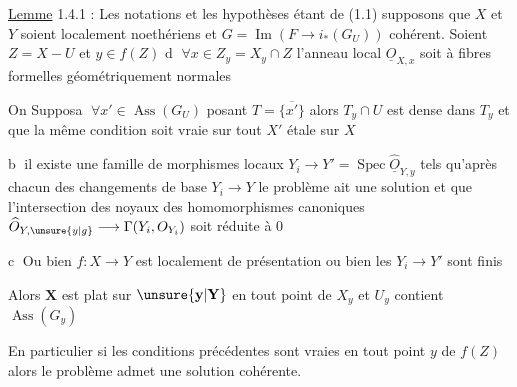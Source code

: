 \uline{Lemme} 1.4.1 : Les notations et les hypothèses étant
 de (1.1) supposons que $X$ et $Y$ soient localement
noethériens et $G=\operatorname{Im}(F\longrightarrow i_*(G_U))$ cohérent. Soient
 $Z=X-U$ et $y\in f(Z)$ 
\textcircled{d} $\forall x\in Z_y=X_y\cap Z$ l'anneau local $\underline O_{X,x}$ soit à fibres formelles
géométriquement normales

On Suppos\textcircled{a} $\forall x'\in\operatorname{Ass}(G_U)$ posant $T=\overline{\{x'\}}$ alors
$T_y\cap U$ est dense dans $T_y$ et que la même condition
soit vraie sur tout $X'$ étale sur $X$

\textcircled{b} il existe une famille de
morphismes locaux $Y_i\longrightarrow Y'=\operatorname{Spec}\widehat{\underline O}_{Y,y}$
tels qu'après chacun des changements de
base $Y_i\longrightarrow Y$ le problème ait une solution
et que l'intersection des noyaux des homomorphismes
canoniques $\widehat O_{Y,\unsure{y|g}}\longrightarrow\Gamma(Y_i,O_{Y_i})$ soit
réduite à $0$

\textcircled{c} Ou bien $f\colon X\longrightarrow Y$ est localement
de présentation  ou bien les $Y_i\longrightarrow Y'$
sont finis

Alors $\mathbf X$ est plat sur $\unsure{\mathbf y|\mathbf Y}$ en tout point de $X_y$
et $U_y$ contient $\operatorname{Ass}(G_y)$

En particulier si les conditions  précédentes
sont vraies en tout point $y$ de $f(Z)$ alors le
problème admet une solution cohérente.


